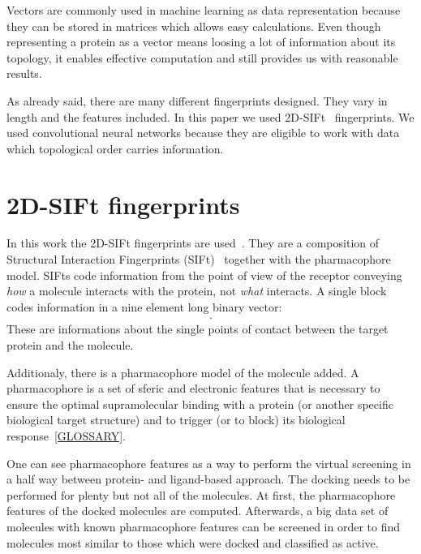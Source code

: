 \documentclass[a4paper,10pt]{report}
\begin{document}
    Vectors are commonly used in machine learning as data representation because they can be stored in matrices which allows easy calculations. Even though representing a protein as a vector means loosing a lot of information about its topology, it enables effective computation and still provides us with reasonable results. 
    
    As already said, there are many different fingerprints designed. They vary in length and the features included. In this paper we used 2D-SIFt~\cite{2DSIFT} fingerprints. We used convolutional neural networks because they are eligible to work with data which topological order carries information.
     
     
    \section{2D-SIFt fingerprints}
    In this work the 2D-SIFt fingerprints are used~\cite{Mordalski2011, cos-jeszcze}. They are a composition of Structural Interaction Fingerprints (SIFt)~\cite{Singh2006} together with the pharmacophore model. SIFts code information from the point of view of the receptor conveying \textit{how} a molecule interacts with the protein, not \textit{what} interacts. A single block codes information in a nine element long binary vector:
    \begin{align*}
    [\text{any contact},&\text{backbone},\text{sidechain},\text{polar},\text{hydrophobic}, \\
    &\text{H-bond acceptor},\text{H-bond donor},\text{aromatic},\text{charged}
    ].
    \end{align*}
    These are informations about the single points of contact between the target protein and the molecule.
    
    Additionaly, there is a pharmacophore model of the molecule added. A pharmacophore is a set of sferic and electronic features that is necessary to ensure the optimal supramolecular binding with a protein (or another specific biological target structure) and to trigger (or to block) its biological response~\ref{GLOSSARY}.
    
    One can see pharmacophore features as a way to perform the virtual screening in a half way between protein- and ligand-based approach. The docking needs to be performed for plenty but not all of the molecules. At first, the pharmacophore features of the docked molecules are computed. Afterwards, a big data set of molecules with known pharmacophore features can be screened in order to find molecules most similar to those which were docked and classified as active.
    
\end{document}
